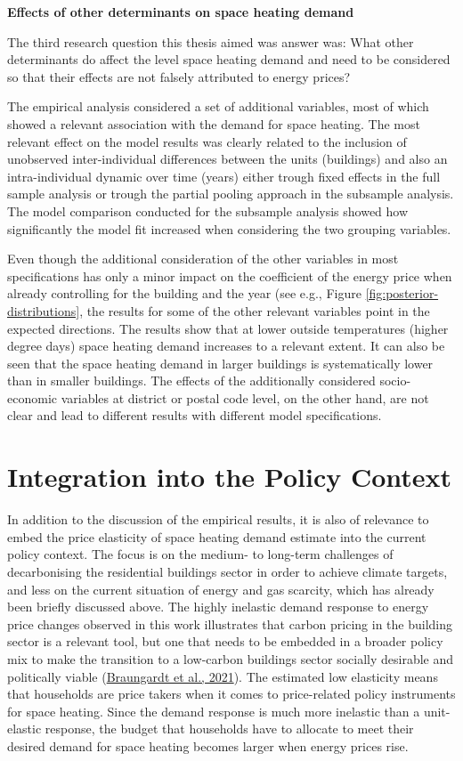 \documentclass[12pt,twoside]{reedthesis}
\begin{document}
\textbf{Effects of other determinants on space heating demand}

The third research question this thesis aimed was answer was: What other determinants do affect the level space heating demand and need to be considered so that their effects are not falsely attributed to energy prices?

The empirical analysis considered a set of additional variables, most of which showed a relevant association with the demand for space heating. The most relevant effect on the model results was clearly related to the inclusion of unobserved inter-individual differences between the units (buildings) and also an intra-individual dynamic over time (years) either trough fixed effects in the full sample analysis or trough the partial pooling approach in the subsample analysis. The model comparison conducted for the subsample analysis showed how significantly the model fit increased when considering the two grouping variables.

Even though the additional consideration of the other variables in most specifications has only a minor impact on the coefficient of the energy price when already controlling for the building and the year (see e.g., Figure \ref{fig:posterior-distributions}, the results for some of the other relevant variables point in the expected directions. The results show that at lower outside temperatures (higher degree days) space heating demand increases to a relevant extent. It can also be seen that the space heating demand in larger buildings is systematically lower than in smaller buildings. The effects of the additionally considered socio-economic variables at district or postal code level, on the other hand, are not clear and lead to different results with different model specifications.

\hypertarget{policy-context}{%
\section{Integration into the Policy Context}\label{policy-context}}

In addition to the discussion of the empirical results, it is also of relevance to embed the price elasticity of space heating demand estimate into the current policy context. The focus is on the medium- to long-term challenges of decarbonising the residential buildings sector in order to achieve climate targets, and less on the current situation of energy and gas scarcity, which has already been briefly discussed above. The highly inelastic demand response to energy price changes observed in this work illustrates that carbon pricing in the building sector is a relevant tool, but one that needs to be embedded in a broader policy mix to make the transition to a low-carbon buildings sector socially desirable and politically viable (\protect\hyperlink{ref-braungardt_etal21}{Braungardt et al., 2021}). The estimated low elasticity means that households are price takers when it comes to price-related policy instruments for space heating. Since the demand response is much more inelastic than a unit-elastic response, the budget that households have to allocate to meet their desired demand for space heating becomes larger when energy prices rise.
\end{document}
